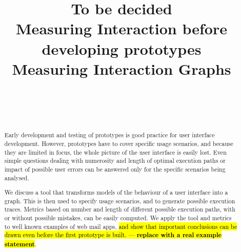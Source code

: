 \documentclass{sigchi}
\begin{document}
\title{To be decided\\
Measuring Interaction before developing prototypes\\
Measuring Interaction Graphs}

\author{%
  \\
  \\
  \\
}

\maketitle

\begin{abstract}
  Early development and testing of prototypes is good
  practice for user interface development. However, prototypes have
  to cover specific usage scenarios, and because they are limited
  in focus, the whole picture of the user interface is easily lost. Even
  simple questions dealing with numerosity and length of
  optimal execution paths or impact of possible user errors can be
  answered only for the specific scenarios being analysed.

  We discuss a tool that transforms models of the behaviour of a user
  interface into a graph. This is then used to specify usage
  scenarios, and to generate possible execution traces. Metrics based
  on number and length of different possible execution paths, with or
  without possible mistakes, can be easily computed. We apply the tool
  and metrics to well known examples of web mail apps, \hl{and show that
  important conclusions can be drawn even before the first prototype
  is built. --- \textbf{replace with a real example statement}}.
  
\end{abstract}

\end{document}
